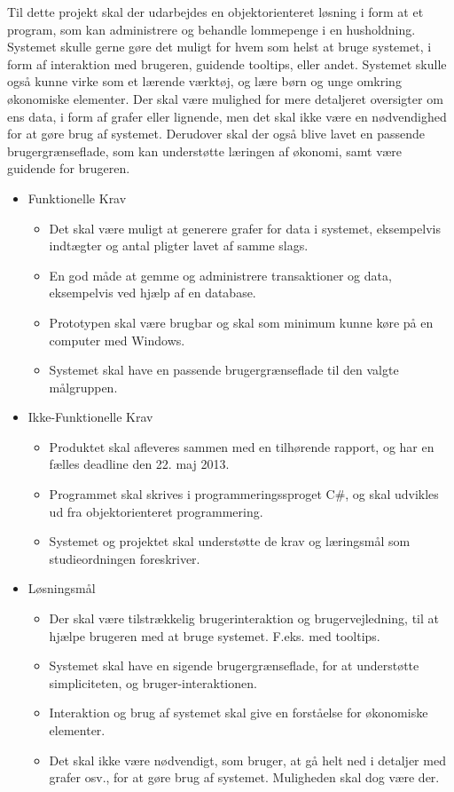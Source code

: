 Til dette projekt skal der udarbejdes en objektorienteret løsning i form at et program, som kan administrere og behandle lommepenge i en husholdning. Systemet skulle gerne gøre det muligt for hvem som helst at bruge systemet, i form af interaktion med brugeren, guidende tooltips, eller andet. Systemet skulle også kunne virke som et lærende værktøj, og lære børn og unge omkring økonomiske elementer. Der skal være mulighed for mere detaljeret oversigter om ens data, i form af grafer eller lignende, men det skal ikke være en nødvendighed for at gøre brug af systemet. Derudover skal der også blive lavet en passende brugergrænseflade, som kan understøtte læringen af økonomi, samt være guidende for brugeren.

\begin{itemize}
	\item Funktionelle Krav
	\begin{itemize}
		\item Det skal være muligt at generere grafer for data i systemet, eksempelvis indtægter og antal pligter lavet af samme slags.
		\item En god måde at gemme og administrere transaktioner og data, eksempelvis ved hjælp af en database.
		\item Prototypen skal være brugbar og skal som minimum kunne køre på en computer med Windows.
		\item Systemet skal have en passende brugergrænseflade til den valgte målgruppen.
	\end{itemize}
	\item Ikke-Funktionelle Krav
	\begin{itemize}
		\item Produktet skal afleveres sammen med en tilhørende rapport, og har en fælles deadline den 22. maj 2013.
		\item Programmet skal skrives i programmeringssproget C\#, og skal udvikles ud fra objektorienteret programmering.
		\item Systemet og projektet skal understøtte de krav og læringsmål som studieordningen foreskriver.
	\end{itemize}
	\item Løsningsmål
	\begin{itemize}
		\item Der skal være tilstrækkelig brugerinteraktion og brugervejledning, til at hjælpe brugeren med at bruge systemet. F.eks. med tooltips.
		\item Systemet skal have en sigende brugergrænseflade, for at understøtte simpliciteten, og bruger-interaktionen.
		\item Interaktion og brug af systemet skal give en forståelse for økonomiske elementer.
		\item Det skal ikke være nødvendigt, som bruger, at gå helt ned i detaljer med grafer osv., for at gøre brug af systemet. Muligheden skal dog være der.
	\end{itemize}
\end{itemize}
